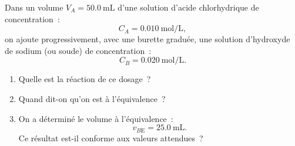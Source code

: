 Dans un volume $V_{A}=\qty{50.0}{\mL}$ d'une solution d'acide chlorhydrique de
concentration~:
\[
    C_{A}=\qty{0.010}{\mol\per\L},
\]
on ajoute progressivement, avec une burette graduée, une solution d'hydroxyde de
sodium (ou soude) de concentration~:
\[
    C_{B}=\qty{0.020}{\mol\per\L}.
\]
\begin{enumerate}
    \item Quelle est la réaction de ce dosage~?
    \item Quand dit-on qu'on est à l'équivalence~?
    \item On a déterminé le volume à l'équivalence~:
          \[
              v_{B\mathrm{E}}=\qty{25.0}{\mL}.
          \]
          Ce résultat est-il conforme aux valeurs attendues~?
\end{enumerate}

